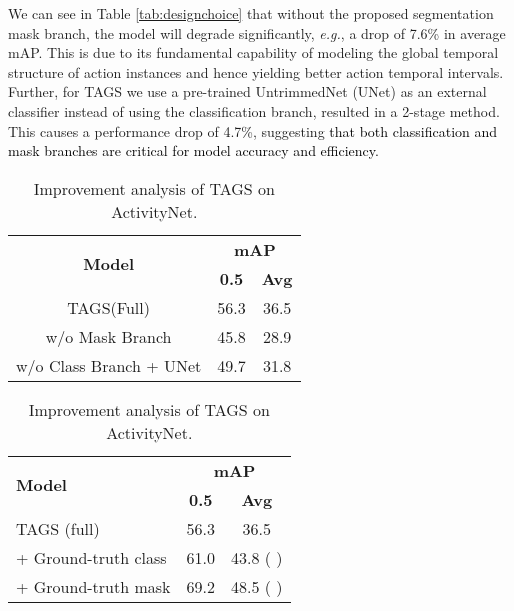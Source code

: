 \documentclass[runningheads]{llncs}
\newcommand{\eg}{\textit{e.g.}}
\newcommand{\shortmodelname}{TAGS}
\begin{document}
We can see in Table \ref{tab:designchoice} that without the proposed segmentation mask branch, the model will degrade significantly, \eg, a drop of 7.6\% in average mAP. This is due to its fundamental capability of modeling the global temporal structure of action instances and hence yielding better action temporal intervals. 
Further, for {\shortmodelname} we use a pre-trained UntrimmedNet (UNet) \cite{wang2017untrimmednets} as an external classifier instead of using the classification branch, resulted in a 2-stage method.
This causes a performance drop of 4.7\%, suggesting
\textcolor{black}{that both classification and mask branches 
are critical for model accuracy and efficiency.}

\begin{table}[h]
	\begin{minipage}{0.45\linewidth}
		\caption{Analysis of {\shortmodelname}'s two branches on ActivityNet.}
      \centering
      \label{tab:designchoice}
        \begin{tabular}{@{}c|c|c@{}}
\toprule
        \multirow{2}{*}{\textbf{Model}}  & \multicolumn{2}{c}{\textbf{mAP}} \\ \cmidrule(l){2-3} 
                                & \textbf{0.5}         & \textbf{Avg}        \\ \midrule
        {\shortmodelname}(Full)               &      56.3       &     36.5       \\ \midrule
        w/o Mask Branch         &      45.8       &    28.9        \\
        w/o Class Branch + UNet &     49.7        &     31.8       \\ \bottomrule
        \end{tabular}
	\end{minipage}\hfill
	\begin{minipage}{0.50\linewidth}
\caption{Improvement analysis of {\shortmodelname} on ActivityNet.}
        \begin{tabular}{l|c|c}
\toprule
        \multirow{2}{*}{\textbf{Model}} & \multicolumn{2}{c}{\textbf{mAP}} \\ \cmidrule(l){2-3} 
        & \textbf{0.5}    & \textbf{Avg}    \\ \midrule
        {\shortmodelname} (full) &     56.3  &     36.5           \\ \midrule
        + Ground-truth class &       61.0          &        43.8 ( )         \\
        + Ground-truth mask   &        69.2         &          48.5 ( )      \\ \bottomrule
        \end{tabular}
        \label{tab:imp_anal}
	\end{minipage}
\end{table}
\end{document}
